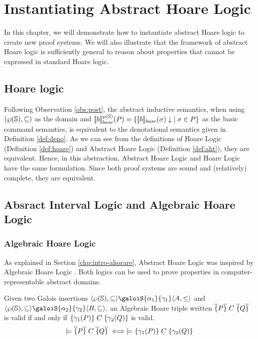 \documentclass[
  10pt,       %
  twoside,    %
  a4paper,    %
  english,    %
  tikz,       %
  openright,  %
]{book}
\begin{document}
\chapter{Instantiating Abstract Hoare Logic}

In this chapter, we will demonstrate how to instantiate abstract Hoare logic to
create new proof systems. We will also illustrate that the framework of
abstract Hoare logic is sufficiently general to reason about properties that
cannot be expressed in standard Hoare logic.

\section{Hoare logic}
\label{chp:inst-hoare}

Following Observation \ref{obs:post}, the abstract inductive semantics, when 
using $(\wp(\mathbb{S}), \subseteq)$ as the domain and 
$\llbracket b \rrbracket_{base}^{\wp(\mathbb{S})}(P) = \{ \llbracket b \rrbracket_{base}(\sigma) \downarrow \; \mid \sigma 
\in P \}$ as the basic command semantics, is equivalent to the denotational 
semantics given in Definition \ref{def:deno}. As we can see from the definitions 
of Hoare Logic (Definition \ref{def:hoare}) and Abstract Hoare Logic (Definition 
\ref{def:aht}), they are equivalent. Hence, in this abstraction, Abstract Hoare 
Logic and Hoare Logic have the same formulation. Since both proof systems are 
sound and (relatively) complete, they are equivalent.
\section{Absract Interval Logic and Algebraic Hoare Logic}

\subsection{Algebraic Hoare Logic}

As explained in Section \ref{chp:intro-ahorare}, Abstract Hoare Logic was
inspired by Algebraic Hoare Logic \cite{Cousot12}. Both logics can be used to
prove properties in computer-representable abstract domains.

\begin{definition}
  Given two Galois insertions $\langle \pow{\states}, \subseteq \rangle
  \galoiS{\alpha_1}{\gamma_1} \langle A, \leq \rangle$ and $\langle
  \pow{\states}, \subseteq \rangle \galoiS{\alpha_2}{\gamma_2} \langle B,
  \sqsubseteq \rangle$, an Algebraic Hoare triple written $\overline{\{} P \overline{\}} \; C \; \overline{\{} Q \overline{\}}$ is
  valid if and only if $\{ \gamma_1(P) \} \; C \; \{ \gamma_2(Q) \}$ is valid.
  $$\models \overline{\{} P \overline{\}} \; C \; \overline{\{} Q \overline{\}} \iff \models \{ \gamma_1(P) \} \; C \; \{ \gamma_2(Q) \}$$
\end{definition}
\end{document}
